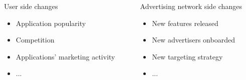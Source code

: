 \documentclass[intlimits, 9pt, unicode]{beamer}
\begin{document}
\begin{frame}
             \vspace{1.2cm}

       {\begin{columns}
        \begin{column}{5cm}
        User side changes
         \begin{itemize}
    		\item Application popularity
		\item Competition
		\item Applications' marketing activity
		\item ...
   	 \end{itemize}
        \end{column}

        \begin{column}{5cm}
        Advertising network side changes
         \begin{itemize}
    		\item New features released
		\item New advertisers onboarded
		\item New targeting strategy
		\item ...
   	 \end{itemize}
	 \end{column}
    \end{columns}}

 \end{frame}
\end{document}
